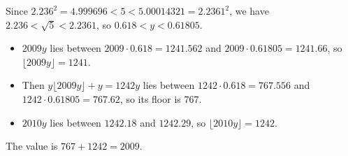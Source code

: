 Since $2.236^2=4.999696<5<5.00014321=2.2361^2$, we have $2.236<\sqrt5<2.2361$, so $0.618<y<0.61805$.
\begin{itemize}
\item $2009y$ lies between $2009\cdot0.618=1241.562$ and $2009\cdot0.61805=1241.66$, so $\lfloor2009y\rfloor=1241$.
\item Then $y\lfloor2009y\rfloor+y=1242y$ lies between $1242\cdot0.618=767.556$ and $1242\cdot0.61805=767.62$, so its floor is $767$.
\item $2010y$ lies between $1242.18$ and $1242.29$, so $\lfloor2010y\rfloor=1242$.
\end{itemize}
The value is $767+1242=\boxed{2009}$.

